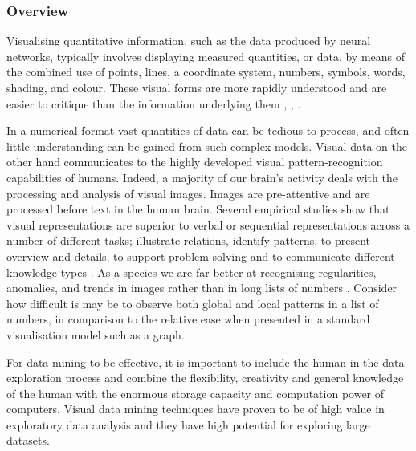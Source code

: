 \documentclass[a4paper,11pt,titlepage]{article}
\begin{document}
	\subsubsection{Overview}
		Visualising quantitative information, such as the data produced by neural networks, typically involves displaying measured quantities, or data, by means of the combined use of points, lines, a coordinate system, numbers, symbols, words, shading, and colour. These visual forms are more rapidly understood and are easier to critique than the information underlying them \cite{DeFanti1989}, \cite{McCormick1987}, \cite{Tufte2001}.
		\par
		In a numerical format vast quantities of data can be tedious to process, and often little understanding can be gained from such complex models. Visual data on the other hand communicates to the highly developed visual pattern-recognition capabilities of humans. Indeed, a majority of our brain's activity deals with the processing and analysis of visual images. Images are pre-attentive and are processed before text in the human brain. Several empirical studies show that visual representations are superior to verbal or sequential representations across a number of different tasks; illustrate relations, identify patterns, to present overview and details, to support problem solving and to communicate different knowledge types \cite{Burkhard2004}. As a species we are far better at recognising regularities, anomalies, and trends in images rather than in long lists of numbers \cite{Ware2010}. Consider how difficult is may be to observe both global and local patterns in a list of numbers, in comparison to the relative ease when presented in a standard visualisation model such as a graph.
		\par 
		For data mining to be effective, it is important to include the human in the data exploration process and combine the flexibility, creativity and general knowledge of the human with the enormous storage capacity and computation power of computers. Visual data mining techniques have proven to be of high value in exploratory data analysis and they have high potential for exploring large datasets.
			  		 
\end{document}
